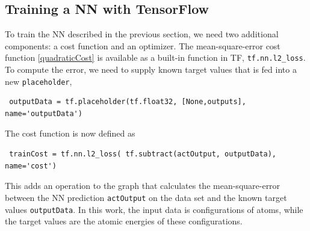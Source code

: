 \documentclass[twoside,english]{uiofysmaster}
\begin{document}
\subsection{Training a NN with TensorFlow} 
To train the NN described in the previous section, we need two additional components:
a cost function and an optimizer. The mean-square-error cost function \eqref{quadraticCost} is available as a 
built-in function in TF, \texttt{tf.nn.l2\_loss}. To compute the error, we need to supply known 
target values that is fed into a new \texttt{placeholder},
\begin{verbatim}
 outputData = tf.placeholder(tf.float32, [None,outputs], name='outputData')
\end{verbatim}
The cost function is now defined as
\begin{verbatim}
 trainCost = tf.nn.l2_loss( tf.subtract(actOutput, outputData), name='cost')
\end{verbatim}
This adds an operation to the graph that calculates the mean-square-error between the NN prediction \texttt{actOutput}
on the data set
and the known target values \texttt{outputData}. In this work, the input data is configurations of atoms, 
while the target values are the atomic energies of these configurations. 
\end{document}
